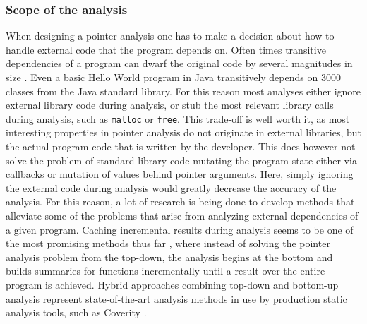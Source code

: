 \subsubsection{Scope of the analysis}
When designing a pointer analysis one has to make a decision about how to handle external code that the program depends on.
Often times transitive dependencies of a program can dwarf the original code by several magnitudes in size \cite{toman2017taming}.
Even a basic Hello World program in Java transitively depends on 3000 classes \cite{kulkarni2016accelerating} from the Java standard library.
For this reason most analyses either ignore external library code during analysis, or stub the most relevant library calls during analysis, such as \verb|malloc| or \verb|free|.
This trade-off is well worth it, as most interesting properties in pointer analysis do not originate in external libraries, but the actual program code that is written by the developer.
This does however not solve the problem of standard library code mutating the program state either via callbacks or mutation of values behind pointer arguments. Here, simply ignoring the external code during analysis would greatly decrease the accuracy of the analysis.
For this reason, a lot of research is being done to develop methods that alleviate some of the problems that arise from analyzing external dependencies of a given program. Caching incremental results during analysis seems to be one of the most promising methods thus far \cite{mcpeak2013scalable}, where instead of solving the pointer analysis problem from the top-down, the analysis begins at the bottom and builds summaries for functions incrementally until a result over the entire program is achieved. Hybrid approaches combining top-down and bottom-up analysis represent state-of-the-art analysis methods in use by production static analysis tools, such as Coverity \cite{mcpeak2013scalable}.

